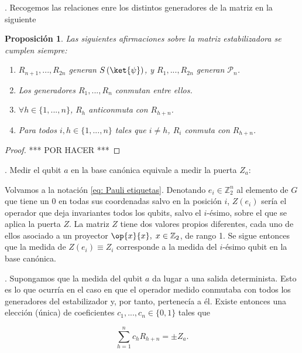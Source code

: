 \documentclass[11pt,a4paper,twoside,pdf]{article}
\numberwithin{equation}{section}
\newtheorem{proposition}{Proposición}
\begin{document}
		. Recogemos las relaciones enre los distintos generadores de la matriz en la siguiente
			
			\begin{proposition}\label{prop: proposicion Aaronson}
				Las siguientes afirmaciones sobre la matriz estabilizadora se cumplen siempre:
				
				\begin{enumerate}[label=(\roman*)]
					\item $R_{n+1},...,R_{2n}$ generan $S\left( \ket{\psi} \right)$, y $R_1,...,R_{2n}$ generan $\mathcal{P}_n$.
					\item Los generadores $R_1,...,R_n$ conmutan entre ellos.
					\item $\forall h \in \{1,...,n\}$, $R_h$ anticonmuta con $R_{h+n}$.
					\item Para todos $ i,h \in \{1,...,n\}$ tales que $i\ne h$, $R_i$ conmuta con $R_{h+n}$.
				\end{enumerate}
			
			\end{proposition}
		
			\begin{proof}
				*** POR HACER ***
			\end{proof}
		
		. Medir el qubit $a$ en la base canónica equivale a medir la puerta $Z_a$:
		
		Volvamos a la notación \ref{eq: Pauli etiquetas}. Denotando $e_i \in \mathbb{Z}_2^n$ al elemento de $G$ que tiene un 0 en todas sus coordenadas salvo en la posición $i$, $Z(e_i)$ sería el operador que deja invariantes todos los qubits, salvo el $i$-ésimo, sobre el que se aplica la puerta $Z$. La matriz $Z$ tiene dos valores propios diferentes, cada uno de ellos asociado a un proyector $\op{x}{x},\; x \in  \mathbb{Z}_2$, de rango 1. Se sigue entonces que la medida de $Z(e_i) \equiv Z_i$ corresponde a la medida del $i$-ésimo qubit en la base canónica.
		
		. Supongamos que la medida del qubit $a$ da lugar a una salida determinista. Esto es lo que ocurría en el caso en que el operador medido conmutaba con todos los generadores del estabilizador y, por tanto, pertenecía a él. Existe entonces una elección (única) de coeficientes $c_1,...,c_n \in \{0,1\}$ tales que 
			
			\begin{equation}\label{eq: medida Z}
				\displaystyle\sum_{h=1}^n c_h R_{h+n} = \pm Z_a .
			\end{equation}
		
\end{document}
